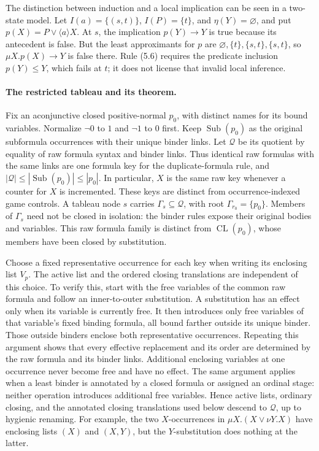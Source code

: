 The distinction between induction and a local
implication can be seen in a two-state model.
Let \(I(a)=\{(s,t)\}\), \(I(P)=\{t\}\), and
\(\eta(Y)=\varnothing\), and put
\(p(X)=P\lor\langle a\rangle X\).
At \(s\), the implication \(p(Y)\to Y\) is true
because its antecedent is false. But the least
approximants for \(p\) are
\(\varnothing,\{t\},\{s,t\},\{s,t\}\), so
\(\mu X.p(X)\to Y\) is false there.
Rule (5.6) requires the predicate inclusion
\(p(Y)\leq Y\), which fails at \(t\); it does
not license that invalid local inference.

\paragraph{The restricted tableau and its theorem.}
Fix an aconjunctive closed positive-normal \(p_0\), with
distinct names for its bound variables. Normalize
\(\neg0\) to \(1\) and \(\neg1\) to \(0\) first.
Keep \(\operatorname{Sub}(p_0)\) as the original
subformula occurrences with their unique binder links.
Let \(\mathcal Q\) be its quotient by equality of
raw formula syntax and binder links. Thus identical
raw formulas with the same links are one formula key
for the duplicate-formula rule, and
\(|\mathcal Q|\leq|\operatorname{Sub}(p_0)|\leq|p_0|\).
In particular, \(X\) is the same raw key whenever
a counter for \(X\) is incremented. These keys
are distinct from occurrence-indexed game controls.
A tableau node \(s\) carries
\(\Gamma_s\subseteq\mathcal Q\), with root
\(\Gamma_{r_0}=\{p_0\}\).
Members of \(\Gamma_s\) need not be closed in isolation:
the binder rules expose their original bodies and variables.
This raw formula family is distinct from
\(\operatorname{CL}(p_0)\), whose members have been closed
by substitution.

Choose a fixed representative occurrence for each key
when writing its enclosing list \(V_p\).
The active list and the ordered closing translations
are independent of this choice. To verify this,
start with the free variables of the common raw
formula and follow an inner-to-outer substitution.
A substitution has an effect only when its variable
is currently free. It then introduces only free
variables of that variable's fixed binding formula,
all bound farther outside its unique binder.
Those outside binders enclose both representative
occurrences. Repeating this argument shows that
every effective replacement and its order are
determined by the raw formula and its binder links.
Additional enclosing variables at one occurrence
never become free and have no effect.
The same argument applies when a least binder is
annotated by a closed formula or assigned an
ordinal stage: neither operation introduces
additional free variables. Hence active lists,
ordinary closing, and the annotated closing
translations used below descend to \(\mathcal Q\),
up to hygienic renaming.
For example, the two \(X\)-occurrences in
\(\mu X.(X\lor\nu Y.X)\) have enclosing lists
\((X)\) and \((X,Y)\), but the \(Y\)-substitution
does nothing at the latter.

